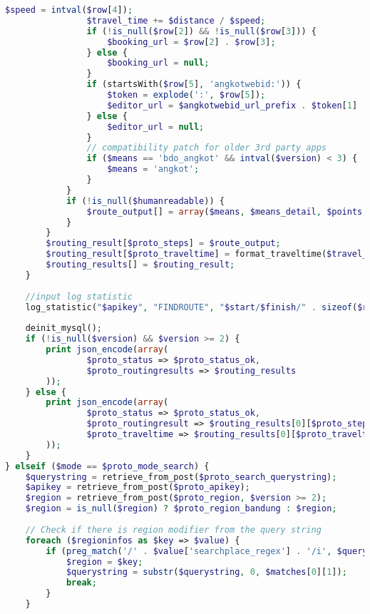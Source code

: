 \begin{lstlisting}[language=PHP,basicstyle=\tiny,caption=handle.php,label={lst:handle.php}]
				$speed = intval($row[4]);
				$travel_time += $distance / $speed;
				if (!is_null($row[2]) && !is_null($row[3])) {
					$booking_url = $row[2] . $row[3];
				} else {
					$booking_url = null;
				}
				if (startsWith($row[5], 'angkotwebid:')) {
					$token = explode(':', $row[5]);
					$editor_url = $angkotwebid_url_prefix . $token[1] . $angkotwebid_url_suffix;
				} else {
					$editor_url = null;
				}
				// compatibility patch for older 3rd party apps
				if ($means == 'bdo_angkot' && intval($version) < 3) {
					$means = 'angkot';
				}
			}
			if (!is_null($humanreadable)) {
				$route_output[] = array($means, $means_detail, $points, $humanreadable, $booking_url, $editor_url);
			}
		}
		$routing_result[$proto_steps] = $route_output;
		$routing_result[$proto_traveltime] = format_traveltime($travel_time);
		$routing_results[] = $routing_result;
	}
	
	//input log statistic
	log_statistic("$apikey", "FINDROUTE", "$start/$finish/" . sizeof($results));
	
	deinit_mysql();
	if (!is_null($version) && $version >= 2) {
		print json_encode(array(
				$proto_status => $proto_status_ok,
				$proto_routingresults => $routing_results
		));
	} else {
		print json_encode(array(
				$proto_status => $proto_status_ok,
				$proto_routingresult => $routing_results[0][$proto_steps],
				$proto_traveltime => $routing_results[0][$proto_traveltime]
		));
	}
} elseif ($mode == $proto_mode_search) {
	$querystring = retrieve_from_post($proto_search_querystring);
	$apikey = retrieve_from_post($proto_apikey);
	$region = retrieve_from_post($proto_region, $version >= 2);
	$region = is_null($region) ? $proto_region_bandung : $region;
	
	// Check if there is region modifier from the query string
	foreach ($regioninfos as $key => $value) {
		if (preg_match('/' . $value['searchplace_regex'] . '/i', $querystring, $matches, PREG_OFFSET_CAPTURE)) {
			$region = $key;
			$querystring = substr($querystring, 0, $matches[0][1]);
			break;
		}
	}
	

\end{lstlisting}
